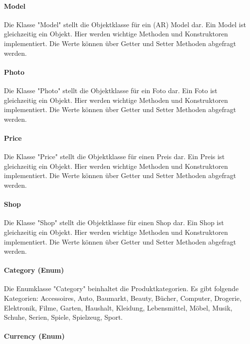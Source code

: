 \documentclass{scrartcl}
\begin{document}
\paragraph{Model}

Die Klasse "Model" stellt die Objektklasse für ein (AR) Model dar. Ein Model ist gleichzeitig ein Objekt. Hier werden wichtige Methoden und Konstruktoren implementiert. Die Werte können über Getter und Setter Methoden abgefragt werden.

\paragraph{Photo}

Die Klasse "Photo" stellt die Objektklasse für ein Foto dar. Ein Foto ist gleichzeitig ein Objekt. Hier werden wichtige Methoden und Konstruktoren implementiert. Die Werte können über Getter und Setter Methoden abgefragt werden.

\paragraph{Price}

Die Klasse "Price" stellt die Objektklasse für einen Preis dar. Ein Preis ist gleichzeitig ein Objekt. Hier werden wichtige Methoden und Konstruktoren implementiert. Die Werte können über Getter und Setter Methoden abgefragt werden.

\paragraph{Shop}

Die Klasse "Shop" stellt die Objektklasse für einen Shop dar. Ein Shop ist gleichzeitig ein Objekt. Hier werden wichtige Methoden und Konstruktoren implementiert. Die Werte können über Getter und Setter Methoden abgefragt werden.

\paragraph{Category (Enum)}

Die Enumklasse "Category" beinhaltet die Produktkategorien. Es gibt folgende Kategorien: Accessoires, Auto, Baumarkt, Beauty, Bücher, Computer, Drogerie, Elektronik, Filme, Garten, Haushalt, Kleidung, Lebensmittel, Möbel, Musik, Schuhe, Serien, Spiele, Spielzeug, Sport.

\paragraph{Currency (Enum)}
\end{document}

